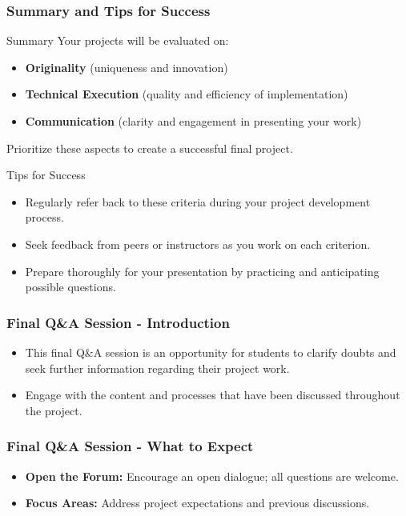 \documentclass[aspectratio=169]{beamer}
\begin{document}
\begin{frame}[fragile]
    \frametitle{Summary and Tips for Success}
    \begin{block}{Summary}
        Your projects will be evaluated on:
        \begin{itemize}
            \item \textbf{Originality} (uniqueness and innovation)
            \item \textbf{Technical Execution} (quality and efficiency of implementation)
            \item \textbf{Communication} (clarity and engagement in presenting your work)
        \end{itemize}
        Prioritize these aspects to create a successful final project.
    \end{block}

    \begin{block}{Tips for Success}
        \begin{itemize}
            \item Regularly refer back to these criteria during your project development process.
            \item Seek feedback from peers or instructors as you work on each criterion.
            \item Prepare thoroughly for your presentation by practicing and anticipating possible questions.
        \end{itemize}
    \end{block}
\end{frame}

\begin{frame}[fragile]
    \frametitle{Final Q\&A Session - Introduction}
    \begin{itemize}
        \item This final Q\&A session is an opportunity for students to clarify doubts and seek further information regarding their project work.
        \item Engage with the content and processes that have been discussed throughout the project.
    \end{itemize}
\end{frame}

\begin{frame}[fragile]
    \frametitle{Final Q\&A Session - What to Expect}
    \begin{itemize}
        \item \textbf{Open the Forum:} Encourage an open dialogue; all questions are welcome.
        \item \textbf{Focus Areas:} Address project expectations and previous discussions.
    \end{itemize}
\end{frame}
\end{document}
